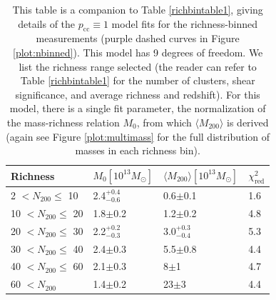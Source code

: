 \begin{landscape}
\begin{table}
\centering
    \caption[Shear Results for Richness-Binned Clusters (Perfectly Centred Model)]{This table is a companion to Table \ref{richbintable1}, giving details of the $p_{\mathrm{cc}} \equiv 1$ model fits for the richness-binned measurements (purple dashed curves in Figure \ref{plot:nbinned}). This model has 9 degrees of freedom. We list the richness range selected (the reader can refer to Table \ref{richbintable1} for the number of clusters, shear significance, and average richness and redshift). For this model, there is a single fit parameter, the normalization of the mass-richness relation $M_0$, from which $\langle M_{200} \rangle$ is derived (again see Figure \ref{plot:multimass} for the full distribution of masses in each richness bin).}
    \begin{tabular}{llll}
      \hline
      Richness & $M_0 \left[ 10^{13} M_{\odot}\right]$ & $\langle M_{200} \rangle \left[ 10^{13} M_{\odot}\right]$ & $\chi^2_{\mathrm{red}}$ \\ \hline
      2 $<N_{200}\leq$ 10 & 2.4$^{+0.4}_{-0.6}$ & 0.6$\pm$0.1 & 1.6  \\
      10 $<N_{200}\leq$ 20 & 1.8$\pm$0.2 & 1.2$\pm$0.2 & 4.8  \\
      20 $<N_{200}\leq$ 30 & 2.2$^{+0.2}_{-0.3}$ & 3.0$^{+0.3}_{-0.4}$ & 5.3  \\
      30 $<N_{200}\leq$ 40 & 2.4$\pm$0.3 & 5.5$\pm$0.8 & 4.4  \\
      40 $<N_{200}\leq$ 60 & 2.1$\pm$0.3 & 8$\pm$1 & 4.7  \\
      60 $<N_{200}$ & 1.4$\pm$0.2 & 23$\pm$3 & 4.4  \\
      \hline
    \end{tabular}
\label{richbintable2}
\end{table}


\end{landscape}

